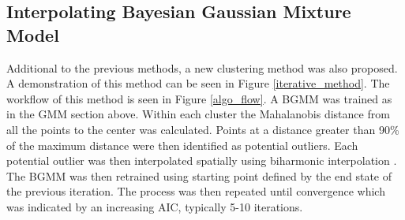 \documentclass[a4paper,11pt]{article}
\begin{document}
\subsection{Interpolating Bayesian Gaussian Mixture Model}

Additional to the previous methods, a new clustering method was also proposed.  A demonstration of this method can be seen in Figure \ref{iterative_method}. The workflow of this method is seen in Figure \ref{algo_flow}. A BGMM was trained as in the GMM section above. Within each cluster the Mahalanobis distance \cite{Mahalanobis1936OnStatistics} from all the points to the center was calculated. Points at a distance greater than 90\% of the maximum distance were then identified as potential outliers. Each potential outlier was then interpolated spatially using biharmonic interpolation \cite{Damelin2017OnAspects}. The BGMM was then retrained using starting point defined by the end state of the previous iteration. The process was then repeated until convergence which was indicated by an increasing AIC, typically 5-10 iterations.
\end{document}
